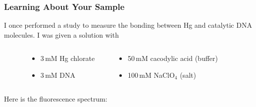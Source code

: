 \documentclass[10pt, xcolor=x11names, compress]{beamer}
\begin{document}
\begin{frame}
  \frametitle{Learning About Your Sample}
  I once performed a study to measure the bonding between Hg and
  catalytic DNA molecules.  I was given a solution with
  \begin{columns}[T]
    \begin{column}{0.125\linewidth}
      ~
    \end{column}
    \begin{column}{0.3\linewidth}
      \begin{itemize}
      \item 3\,mM Hg chlorate
      \item 3\,mM DNA
      \end{itemize}
    \end{column}
    \begin{column}{0.45\linewidth}
      \begin{itemize}
      \item 50\,mM cacodylic acid (buffer)
      \item 100\,mM NaClO$_4$ (salt)
      \end{itemize}
    \end{column}
    \begin{column}{0.125\linewidth}
      ~
    \end{column}
  \end{columns}

  \medskip

  Here is the fluorescence spectrum:\\[1ex]
  \begin{columns}
    \begin{column}{0.5\linewidth}
    \end{column}
    \begin{column}{0.5\linewidth}
      \begin{center}
\end{center}
\end{column}
\end{columns}
\end{frame}
\end{document}
